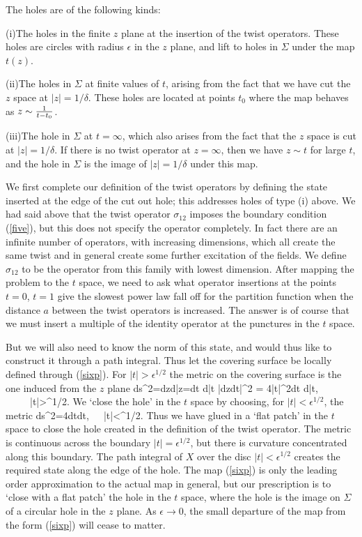 \documentclass[12pt]{article}
\begin{document}
  The holes
are of the following kinds:

(i)\quad The holes in the finite $z$ plane at the insertion of the
twist operators. These holes are circles with
radius $\epsilon$ in the $z$ plane, and lift to holes in $\Sigma$
under the map $t(z)$.

(ii)\quad The holes in $\Sigma$ at finite values of $t$, arising from
the fact that we have cut the $z$ space at
$|z|=1/\delta$. These holes are located at points $t_0$ where the map
behaves as $z\sim {1\over t-t_0}$.

(iii)\quad The hole in $\Sigma$ at $t=\infty$, which also arises from
the fact that the $z$ space is cut at
$|z|=1/\delta$.  If there is no twist operator at $z=\infty$, then we 
have $z\sim t$ for large $t$,  and the
hole in $\Sigma$ is the image of $|z|=1/\delta$ under this map.



     We first  complete our
definition of the twist operators by defining  the state inserted at
the edge of the cut out
hole; this addresses holes of type (i) above.  We had said above that
the twist operator $\sigma_{12}$ imposes
the boundary condition (\ref{five}), but this does not
specify the operator completely. In fact there are an infinite number
of operators, with increasing dimensions, which all
create the same twist and in general create some further excitation
of the fields. We define $\sigma_{12}$  to be the operator  from this 
family with  lowest dimension. After
mapping the problem to the $t$ space, we need to ask what operator insertions
at the points $t=0$, $t=1$ give the slowest power law fall off for
the partition function when the distance $a$ between the
twist operators is increased. The answer is of course that we must
insert a multiple of the identity operator at the punctures in the $t$
space.


But we will also need to know the norm of this  state, and would thus
like to construct it through a path integral.
Thus let the covering surface be locally defined through
(\ref{sixp}). For $|t|>\epsilon^{1/2}$ the metric on the
covering surface is the one induced from the $z$ plane
\be
ds^2=dzd\bar z=dt d\bar t |{dz\over dt}|^2 =  4|t|^2dt d\bar t,
~~~~~|t|>\epsilon^{1/2}.
\ee
We `close the hole' in the $t$ space by choosing, for
$|t|<\epsilon^{1/2}$, the metric
\be
ds^2=4\epsilon dtd\tilde t,~~~|t|<\epsilon^{1/2}.
\label{sevenp}
\ee
Thus we have glued in a `flat patch'  in the $t$ space to close the
hole  created in the definition of the twist
operator. The metric is continuous across the boundary
$|t|=\epsilon^{1/2}$, but there is curvature
concentrated along this boundary. The path integral of $X$ over the
disc $|t|<\epsilon^{1/2}$ creates the required
state along the edge of the hole.  The map (\ref{sixp}) is only the
leading order approximation to the
actual map in general, but our prescription is to `close with a flat
patch' the hole in the $t$ space,
where the hole is the image on $\Sigma$ of a circular hole in the $z$
plane. As $\epsilon\rightarrow 0$, the
small departure of the map from the  form (\ref{sixp}) will cease to matter.
\end{document}
